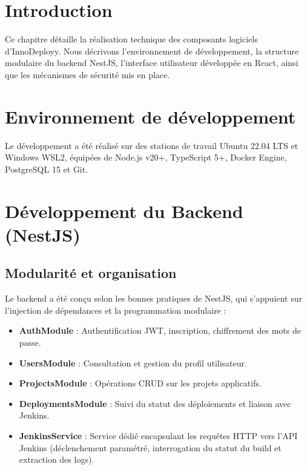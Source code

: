 \documentclass[12pt,a4paper,oneside]{report}
\begin{document}
\section{Introduction}
Ce chapitre détaille la réalisation technique des composants logiciels d'InnoDeployy. Nous décrivons l'environnement de développement, la structure modulaire du backend NestJS, l'interface utilisateur développée en React, ainsi que les mécanismes de sécurité mis en place.

\section{Environnement de développement}
Le développement a été réalisé sur des stations de travail Ubuntu 22.04 LTS et Windows WSL2, équipées de Node.js v20+, TypeScript 5+, Docker Engine, PostgreSQL 15 et Git.

\section{Développement du Backend (NestJS)}
\subsection{Modularité et organisation}
Le backend a été conçu selon les bonnes pratiques de NestJS, qui s'appuient sur l'injection de dépendances et la programmation modulaire :
\begin{itemize}[label=$\bullet$]
    \item \textbf{AuthModule} : Authentification JWT, inscription, chiffrement des mots de passe.
    \item \textbf{UsersModule} : Consultation et gestion du profil utilisateur.
    \item \textbf{ProjectsModule} : Opérations CRUD sur les projets applicatifs.
    \item \textbf{DeploymentsModule} : Suivi du statut des déploiements et liaison avec Jenkins.
    \item \textbf{JenkinsService} : Service dédié encapsulant les requêtes HTTP vers l'API Jenkins (déclenchement paramétré, interrogation du statut du build et extraction des logs).
\end{itemize}
\end{document}
